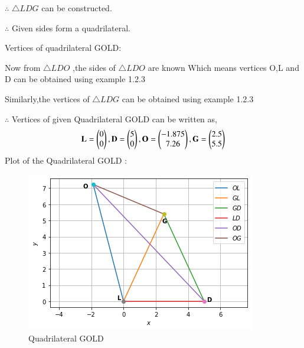 \documentclass[journal,12pt,twocolumn]{IEEEtran}
\begin{document}
\begin{enumerate}
$\therefore$ $\triangle LDG$ can be constructed.

$\therefore$ Given sides form a quadrilateral.

Vertices of quadrilateral GOLD:

Now from $\triangle LDO$ ,the sides of $\triangle LDO$ are known Which means vertices O,L and D can be obtained using example 1.2.3

Similarly,the vertices of $\triangle LDG$ can be obtained using example 1.2.3

$\therefore$ Vertices of given Quadrilateral GOLD can be written as,
\begin{align}
\mathbf{L}=\begin{pmatrix}0\\0\end{pmatrix},\mathbf{D} = \begin{pmatrix}5\\0\end{pmatrix}, \mathbf{O}=\begin{pmatrix}-1.875\\7.26\end{pmatrix},\mathbf{G}=\begin{pmatrix}2.5\\5.5\end{pmatrix}
\end{align}
Plot of the Quadrilateral GOLD :
\begin{figure}[!ht]
    \centering
    \includegraphics[width=\columnwidth]{GOLDfig.png}
    \caption{Quadrilateral GOLD}
    \label{fig:Quadrilateral GOLD}
\end{figure}
\end{enumerate}
\end{document}
